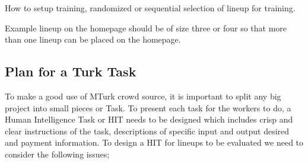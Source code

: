 \documentclass[11pt]{article}
\begin{document}
How to setup training, randomized or sequential selection of lineup for training.

Example lineup on the homepage should be of size three or four so that more than one lineup can be placed on the homepage.

\subsection{Plan for a Turk Task} \label{sec:task_plan} To make a good use of MTurk crowd source, it is important to split any big project into small pieces or Task. To present each task for the workers to do, a Human Intelligence Task or HIT needs to be designed which includes crisp and clear instructions of the task, descriptions of specific input and output desired and payment information. To design a HIT for lineups to be evaluated we need to consider the following issues;
\end{document}
